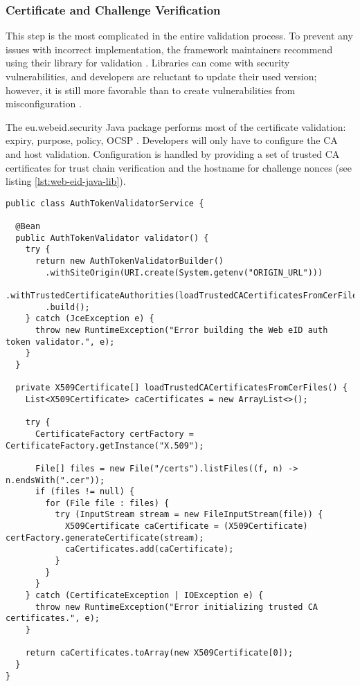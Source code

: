 \subsubsection{Certificate and Challenge Verification}

This step is the most complicated in the entire validation process. To prevent any issues with incorrect implementation, the framework maintainers recommend using their library for validation \cite{ria-webeid-source-web-eid-authtoken-validation-java-readme}. Libraries can come with security vulnerabilities, and developers are reluctant to update their used version; however, it is still more favorable than to create vulnerabilities from misconfiguration \cite{9240619}.

The eu.webeid.security Java package performs most of the certificate validation: expiry, purpose, policy, OCSP \cite{ria-webeid-source-web-eid-authtoken-validation-java-readme}. Developers will only have to configure the CA and host validation. Configuration is handled by providing a set of trusted CA certificates for trust chain verification and the hostname for challenge nonces (see listing \ref{lst:web-eid-java-lib}).

\begin{lstlisting}[caption={Web eID Login Endpoint}, label={lst:web-eid-java-lib}]
public class AuthTokenValidatorService {

  @Bean
  public AuthTokenValidator validator() {
    try {
      return new AuthTokenValidatorBuilder()
        .withSiteOrigin(URI.create(System.getenv("ORIGIN_URL")))
        .withTrustedCertificateAuthorities(loadTrustedCACertificatesFromCerFiles())
        .build();
    } catch (JceException e) {
      throw new RuntimeException("Error building the Web eID auth token validator.", e);
    }
  }

  private X509Certificate[] loadTrustedCACertificatesFromCerFiles() {
    List<X509Certificate> caCertificates = new ArrayList<>();

    try {
      CertificateFactory certFactory = CertificateFactory.getInstance("X.509");

      File[] files = new File("/certs").listFiles((f, n) -> n.endsWith(".cer"));
      if (files != null) {
        for (File file : files) {
          try (InputStream stream = new FileInputStream(file)) {
            X509Certificate caCertificate = (X509Certificate) certFactory.generateCertificate(stream);
            caCertificates.add(caCertificate);
          }
        }
      }
    } catch (CertificateException | IOException e) {
      throw new RuntimeException("Error initializing trusted CA certificates.", e);
    }

    return caCertificates.toArray(new X509Certificate[0]);
  }
}
\end{lstlisting}

